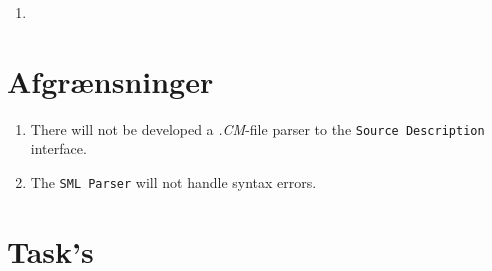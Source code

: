 \documentclass[a4paper,oneside]{memoir}
\begin{document}
\begin{enumerate}
\item 
\end{enumerate}

\section{Afgrænsninger}

\begin{enumerate}
\item There will not be developed a \textit{.CM}-file parser to the
  \texttt{Source Description} interface.

\item The \texttt{SML Parser} will not handle syntax errors. 
\end{enumerate}


\section{Task's}
\end{document}
